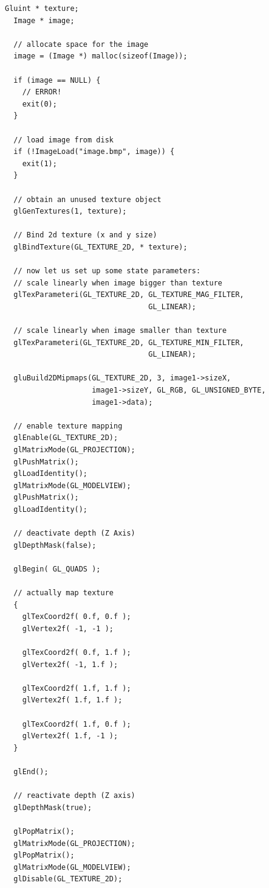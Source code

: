\begin{lstlisting}[caption={Texture example}, label={code:texturemapping}, frame=trBL]
  Gluint * texture;
  Image * image;
    
  // allocate space for the image
  image = (Image *) malloc(sizeof(Image));

  if (image == NULL) {
    // ERROR!
    exit(0);
  }

  // load image from disk
  if (!ImageLoad("image.bmp", image)) {
    exit(1);
  }        

  // obtain an unused texture object
  glGenTextures(1, texture);

  // Bind 2d texture (x and y size)
  glBindTexture(GL_TEXTURE_2D, * texture);   

  // now let us set up some state parameters:
  // scale linearly when image bigger than texture
  glTexParameteri(GL_TEXTURE_2D, GL_TEXTURE_MAG_FILTER,
                                 GL_LINEAR);
 
  // scale linearly when image smaller than texture
  glTexParameteri(GL_TEXTURE_2D, GL_TEXTURE_MIN_FILTER,
                                 GL_LINEAR); 

  gluBuild2DMipmaps(GL_TEXTURE_2D, 3, image1->sizeX, 
                    image1->sizeY, GL_RGB, GL_UNSIGNED_BYTE, 
                    image1->data);

  // enable texture mapping
  glEnable(GL_TEXTURE_2D);
  glMatrixMode(GL_PROJECTION);
  glPushMatrix();
  glLoadIdentity();
  glMatrixMode(GL_MODELVIEW);
  glPushMatrix();
  glLoadIdentity();

  // deactivate depth (Z Axis)
  glDepthMask(false);

  glBegin( GL_QUADS );

  // actually map texture
  {
    glTexCoord2f( 0.f, 0.f );
    glVertex2f( -1, -1 );

    glTexCoord2f( 0.f, 1.f );
    glVertex2f( -1, 1.f );

    glTexCoord2f( 1.f, 1.f );
    glVertex2f( 1.f, 1.f );

    glTexCoord2f( 1.f, 0.f );
    glVertex2f( 1.f, -1 );
  }

  glEnd();

  // reactivate depth (Z axis)
  glDepthMask(true);

  glPopMatrix();
  glMatrixMode(GL_PROJECTION);
  glPopMatrix();
  glMatrixMode(GL_MODELVIEW);
  glDisable(GL_TEXTURE_2D);
\end{lstlisting}
%

%

